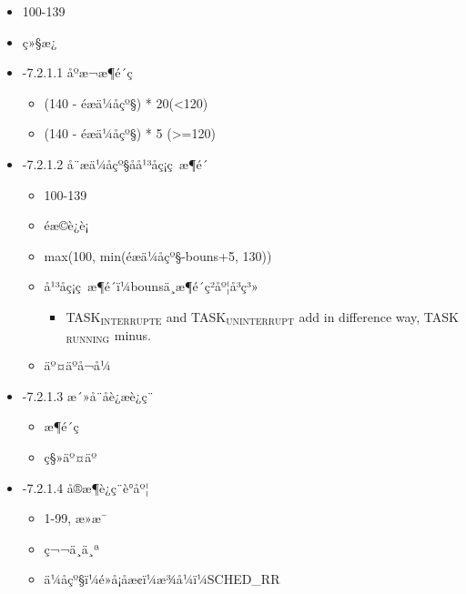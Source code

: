 \documentclass[11pt]{article}
\begin{document}
\begin{itemize}
\item 100-139
\item ç»§æ¿
\end{itemize}
\begin{itemize}

\item -7.2.1.1 åºæ¬æ¶é´ç\\
\label{sec-2.2.1.1}

\begin{itemize}
\item (140 - éæä¼åçº§) * 20(<120)
\item (140 - éæä¼åçº§) * 5 (>=120)
\end{itemize}

\item -7.2.1.2 å¨æä¼åçº§åå¹³åç¡ç æ¶é´\\
\label{sec-2.2.1.2}

\begin{itemize}
\item 100-139
\item éæ©è¿è¡
\item max(100, min(éæä¼åçº§-bouns+5, 130))
\item å¹³åç¡ç æ¶é´ï¼bounsä¸æ¶é´ç²åº¦å³ç³»

\begin{itemize}
\item TASK$_{\mathrm{INTERRUPTE}}$ and TASK$_{\mathrm{UNINTERRUPT}}$ add in difference way, TASK$_{\mathrm{RUNNING}}$
    minus.
\end{itemize}

\item äº¤äºå¬å¼
\end{itemize}

\item -7.2.1.3 æ´»å¨åè¿æè¿ç¨\\
\label{sec-2.2.1.3}

\begin{itemize}
\item æ¶é´ç
\item ç§»äº¤äº
\end{itemize}

\item -7.2.1.4 å®æ¶è¿ç¨è°åº¦\\
\label{sec-2.2.1.4}

\begin{itemize}
\item 1-99, æ»æ¯
\item ç¬¬ä¸ä¸ª
\item ä¼åçº§ï¼é»å¡åæ­¢ï¼æ¾å¼ï¼SCHED\_RR
\end{itemize}
\end{itemize} %
\end{document}
